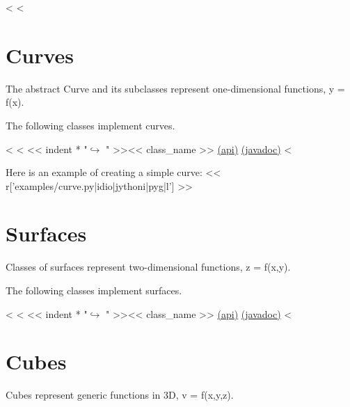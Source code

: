 <%
<%

\section{Curves}

The abstract Curve and its subclasses represent one-dimensional functions, y = f(x).

The following classes implement curves.

\begin{fullwidth}
<%
<%
<< indent * "$\hookrightarrow$ " >><< class_name >> \href{http://docs-static.opengamma.com/{{ OG_VERSION }}/analytics/api/<< package_name >>.html#class-<<class_name>>}{(api)} \href{http://docs-static.opengamma.com/{{ OG_VERSION }}/java/javadocs/<< class_name.replace(".","/") >>.html}{(javadoc)}
<%
\end{fullwidth}

Here is an example of creating a simple curve:
<< r['examples/curve.py|idio|jythoni|pyg|l'] >>

\section{Surfaces}

Classes of surfaces represent two-dimensional functions, z = f(x,y).

The following classes implement surfaces.

\begin{fullwidth}
<%
<%
<< indent * "$\hookrightarrow$ " >><< class_name >> \href{http://docs-static.opengamma.com/{{ OG_VERSION }}/analytics/api/<< package_name >>.html#class-<<class_name>>}{(api)} \href{http://docs-static.opengamma.com/{{ OG_VERSION }}/java/javadocs/<< class_name.replace(".","/") >>.html}{(javadoc)}
<%
\end{fullwidth}

\section{Cubes}

Cubes represent generic functions in 3D, v = f(x,y,z).


